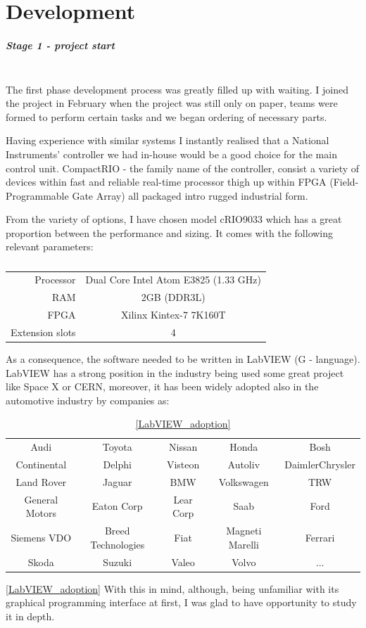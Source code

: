 \chapter{Development}
\paragraph{Stage 1 - project start}\mbox{}\\
The first phase development process was greatly filled up with waiting. I joined the project in February when the project was still only on paper, teams were formed to perform certain tasks and we began ordering of necessary parts.

Having experience with similar systems I instantly realised that a National Instruments' controller we had in-house would be a good choice for the main control unit. CompactRIO - the family name of the controller, consist a variety of devices within fast and reliable real-time processor thigh up within FPGA (Field-Programmable Gate Array) all packaged intro rugged industrial form.

From the variety of options, I have chosen model cRIO9033 which has a great proportion between the performance and sizing. It comes with the following relevant parameters:
\begin{table}[H]
    \centering
    \begin{tabular}{r|c}
        Processor & Dual Core Intel Atom E3825 (1.33 GHz) \\
        RAM & 2GB (DDR3L) \\
        FPGA & Xilinx Kintex-7 7K160T \\
        Extension slots & 4
    \end{tabular}
    \caption*{}
    \label{tab:cRIO_param}
    \vspace{-20pt}
\end{table}

As a consequence, the software needed to be written in LabVIEW (G - language). LabVIEW has a strong position in the industry being used some great project like Space X or CERN, moreover, it has been widely adopted also in the automotive industry by companies as:
\begin{table}[H]
    \centering
    \begin{tabular}{c|c|c|c|c}
        Audi & Toyota & Nissan & Honda & Bosh \\ 
        Continental & Delphi & Visteon & Autoliv & DaimlerChrysler \\
        Land Rover & Jaguar & BMW & Volkswagen & TRW \\
        General Motors & Eaton Corp & Lear Corp & Saab & Ford \\
        Siemens VDO & Breed Technologies & Fiat & Magneti Marelli & Ferrari \\
        Skoda & Suzuki & Valeo & Volvo & ...
    \end{tabular}
    \caption*{\ref{LabVIEW_adoption}}
    \label{tab:LabVIEW_adoption}
\end{table}\ref{LabVIEW_adoption}
With this in mind, although, being unfamiliar with its graphical programming interface at first, I was glad to have opportunity to study it in depth.

